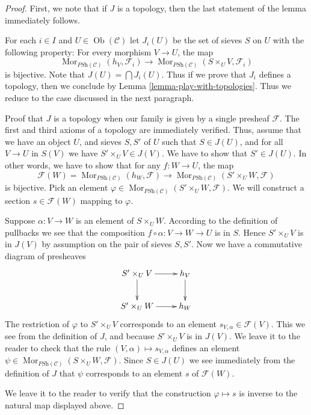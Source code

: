 \documentclass[10pt,a4paper]{amsart}
\theoremstyle{plain}
\theoremstyle{definition}
\theoremstyle{remark}
\numberwithin{equation}{subsection}
\def\Mor{\mathop{\mathrm{Mor}}\nolimits}
\def\Ob{\mathop{\mathrm{Ob}}\nolimits}
\begin{document}
\begin{proof}
First, we note that if $J$ is a topology, then the last statement of
the lemma immediately follows.

\medskip\noindent
For each $i \in I$ and $U \in \Ob(\mathcal{C})$ let $J_i(U)$
be the set of sieves $S$ on $U$ with the following property:
For every morphism $V \to U$, the map
$$
\Mor_{\textit{PSh}(\mathcal{C})}(h_V, \mathcal{F}_i)
\longrightarrow
\Mor_{\textit{PSh}(\mathcal{C})}(S \times_U V, \mathcal{F}_i)
$$
is bijective. Note that $J(U) = \bigcap J_i(U)$. Thus if we prove
that $J_i$ defines a topology, then we conclude by
Lemma \ref{lemma-play-with-topologies}.
Thus we reduce to the case discussed in the next paragraph.

\medskip\noindent
Proof that $J$ is a topology when our family is given by a single
presheaf $\mathcal{F}$. The first and third axioms of
a topology are immediately verified. Thus, assume that
we have an object $U$, and sieves $S, S'$ of $U$
such that $S \in J(U)$, and for all $V \to U$ in $S(V)$
we have $S' \times_U V \in J(V)$. We have to show that
$S' \in J(U)$. In other words, we have to show that for
any $f : W \to U$, the map
$$
\mathcal{F}(W) =
\Mor_{\textit{PSh}(\mathcal{C})}(h_W, \mathcal{F})
\longrightarrow
\Mor_{\textit{PSh}(\mathcal{C})}(S' \times_U W, \mathcal{F})
$$
is bijective. Pick an element $\varphi \in
\Mor_{\textit{PSh}(\mathcal{C})}(S' \times_U W, \mathcal{F})$.
We will construct a section $s \in \mathcal{F}(W)$
mapping to $\varphi$.

\medskip\noindent
Suppose $\alpha : V \to W$ is an element of $S \times_U W$.
According to the definition of pullbacks we see that
the composition $f \circ \alpha : V \to W  \to U$ is in $S$. Hence
$S' \times_U V$ is in $J(V)$ by assumption on the pair
of sieves $S, S'$. Now we have a commutative diagram
of presheaves
$$
\xymatrix{
S' \times_U V \ar[r] \ar[d] & h_V \ar[d] \\
S' \times_U W \ar[r] & h_W
}
$$
The restriction of $\varphi$ to $S' \times_U V$
corresponds to an element $s_{V, \alpha} \in \mathcal{F}(V)$.
This we see from the definition of $J$,
and because $S' \times_U V$ is in $J(V)$.
We leave it to the reader to check
that the rule $(V, \alpha) \mapsto s_{V, \alpha}$ defines
an element
$\psi \in
\Mor_{\textit{PSh}(\mathcal{C})}(S \times_U W, \mathcal{F})$.
Since $S \in J(U)$ we see immediately from the definition of $J$
that $\psi$ corresponds to an element $s$ of $\mathcal{F}(W)$.

\medskip\noindent
We leave it to the reader to verify that the construction
$\varphi \mapsto s$ is inverse to the natural map displayed above.
\end{proof}
\end{document}
